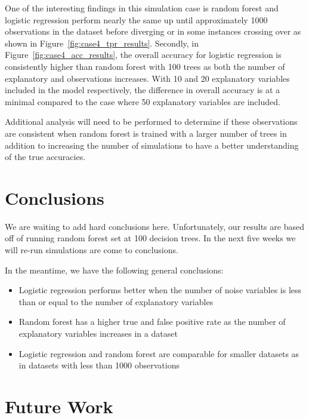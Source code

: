 \documentclass{llncs}
\begin{document}
\noindent 
One of the interesting findings in this simulation case is random forest and logistic regression perform nearly the same up until approximately 1000 observations in the dataset before diverging or in some instances crossing over as shown in Figure~\ref{fig:case4_tpr_results}. Secondly, in Figure~\ref{fig:case4_acc_results}, the overall accuracy for logistic regression is consistently higher than random forest with 100 trees as both the number of explanatory and observations increases. With 10 and 20 explanatory variables included in the model respectively, the difference in overall accuracy is at a minimal compared to the case where 50 explanatory variables are included. 


\noindent 
Additional analysis will need to be performed to determine if these observations are consistent when random forest is trained with a larger number of trees in addition to increasing the number of simulations to have a better understanding of the true accuracies.

\section{Conclusions}
\noindent 
We are waiting to add hard conclusions here.  Unfortunately, our results are based off of running random forest set at 100 decision trees.  In the next five weeks we will re-run simulations are come to conclusions.

In the meantime, we have the following general conclusions:
\begin{itemize}
  \item Logistic regression performs better when the number of noise variables is less than or equal to the number of explanatory variables
  \item Random forest has a higher true and false positive rate as the number of explanatory variables increases in a dataset
  \item Logistic regression and random forest are comparable for smaller datasets as in datasets with less than 1000 observations

\end{itemize}

\section{Future Work}
\noindent 
\end{document}
